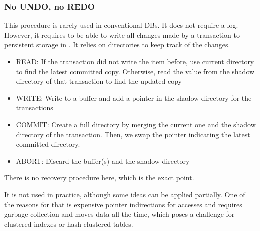 \subsubsection{No UNDO, no REDO}
This procedure is rarely used in conventional DBs. It does not require a log.
However, it requires to be able to write all changes made by a transaction to persistent storage in .
It relies on directories to keep track of the changes.
\begin{itemize}
    \item READ: If the transaction did not write the item before, use current directory to find the latest committed copy.
          Otherwise, read the value from the shadow directory of that transaction to find the updated copy
    \item WRITE: Write to a buffer and add a pointer in the shadow directory for the transactions
    \item COMMIT: Create a full directory by merging the current one and the shadow directory of the transaction.
          Then, we swap the pointer indicating the latest committed directory.
    \item ABORT: Discard the buffer(s) and the shadow directory
\end{itemize}
There is no recovery procedure here, which is the exact point.

It is not used in practice, although some ideas can be applied partially.
One of the reasons for that is expensive pointer indirections for accesses and requires garbage collection and moves data all the time,
which poses a challenge for clustered indexes or hash clustered tables.
